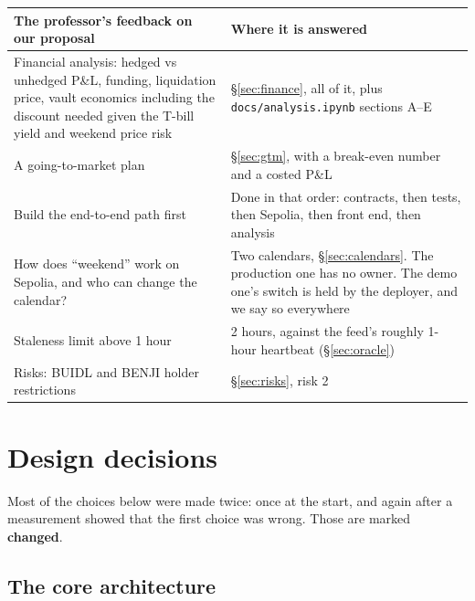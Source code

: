 \documentclass[11pt,a4paper]{article}
\begin{document}
\begin{center}
\small
\begin{tabular}{@{}p{7.2cm}p{8.6cm}@{}}
\toprule
\textbf{The professor's feedback on our proposal} & \textbf{Where it is answered} \\
\midrule
Financial analysis: hedged vs unhedged P\&L, funding, liquidation price, vault economics including the discount needed given the T-bill yield and weekend price risk & \S\ref{sec:finance}, all of it, plus \texttt{docs/analysis.ipynb} sections A--E \\
A going-to-market plan & \S\ref{sec:gtm}, with a break-even number and a costed P\&L \\
Build the end-to-end path first & Done in that order: contracts, then tests, then Sepolia, then front end, then analysis \\
How does ``weekend'' work on Sepolia, and who can change the calendar? & Two calendars, \S\ref{sec:calendars}. The production one has no owner. The demo one's switch is held by the deployer, and we say so everywhere \\
Staleness limit above 1 hour & 2 hours, against the feed's roughly 1-hour heartbeat (\S\ref{sec:oracle}) \\
Risks: BUIDL and BENJI holder restrictions & \S\ref{sec:risks}, risk 2 \\
\bottomrule
\end{tabular}
\end{center}

\section{Design decisions}\label{sec:design}

Most of the choices below were made twice: once at the start, and again after a measurement showed
that the first choice was wrong. Those are marked \textbf{changed}.

\subsection{The core architecture}
\end{document}
